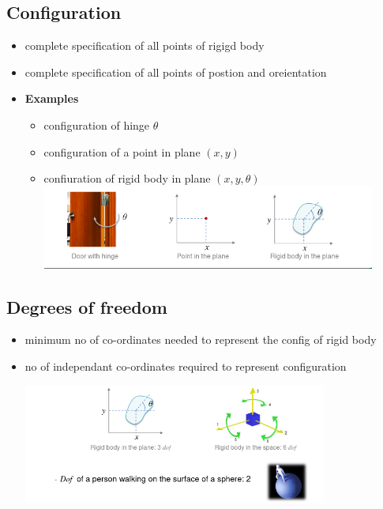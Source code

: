 \documentclass{article}
\begin{document}
\subsection{Configuration}
\begin{itemize}
	\item complete specification of all points of  rigigd body
	\item complete specification of all points of postion and oreientation
	\item \textbf{Examples}
	      \begin{itemize}
		      \item configuration of hinge  \(\theta\)
		      \item configuration of a point in plane  $(x,y)$
		      \item confiuration of rigid body in plane $(x,y,\theta)$ \\
		            \includegraphics[width=11cm]{img/configurationRigid.png}
	      \end{itemize}
\end{itemize}
\subsection{Degrees of freedom}
\begin{itemize}
	\item minimum no of co-ordinates needed to represent the config of rigid body
	\item no of independant co-ordinates required to represent configuration
	      \begin{center}
		      \includegraphics[width=10cm]{img/dof-rigidbody.png}
	      \end{center}
\end{itemize}
\end{document}
